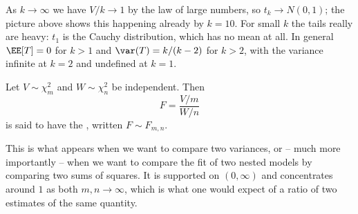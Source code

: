 As $k \to \infty$ we have $V/k \to 1$ by the law of large numbers, so $t_k \to N(0,1)$; the picture above shows this happening already by $k = 10$. For small $k$ the tails really are heavy: $t_1$ is the Cauchy distribution, which has no mean at all. In general $\EE[T] = 0$ for $k > 1$ and $\var(T) = k/(k-2)$ for $k > 2$, with the variance infinite at $k = 2$ and undefined at $k=1$.

\begin{definition}[$F$-Distribution]
  Let $V \sim \chi^2_m$ and $W \sim \chi^2_n$ be independent. Then
  $$
  F = \frac{V/m}{W/n}
  $$
  is said to have the , written $F \sim F_{m,n}$.
\end{definition}

This is what appears when we want to compare two variances, or -- much more importantly -- when we want to compare the fit of two nested models by comparing two sums of squares. It is supported on $(0, \infty)$ and concentrates around $1$ as both $m, n \to \infty$, which is what one would expect of a ratio of two estimates of the same quantity.

